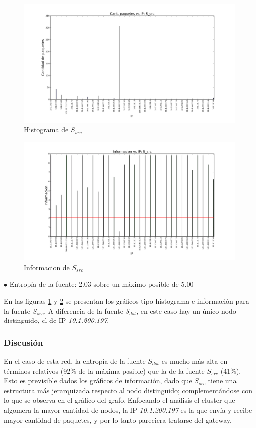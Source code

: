 \begin{figure}[H]\centering
    \includegraphics[width=\linewidth]{../imgs/red-entrepiso-dc_S_src_hist.png}
    \caption{Histograma de $S_{src}$}\label{fig:entrepiso-dc-src-hist}
\end{figure}

\begin{figure}[H]\centering
    \includegraphics[width=\linewidth]{../imgs/red-entrepiso-dc_S_src_info.png}
    \caption{Informacion de $S_{src}$}\label{fig:entrepiso-dc-src-info}
\end{figure}

$\bullet$ Entropía de la fuente: 2.03 sobre un máximo posible de 5.00

En las figuras \ref{fig:entrepiso-dc-src-hist} y \ref{fig:entrepiso-dc-src-info} se presentan los gráficos tipo histograma e información para la fuente $S_{src}$. A diferencia de la fuente $S_{dst}$, en este caso hay un único nodo distinguido, el de IP \emph{10.1.200.197}.

\subsubsection{Discusión}

En el caso de esta red, la entropía de la fuente $S_{dst}$ es mucho más alta en términos relativos (92\% de la máxima posible) que la de la fuente $S_{src}$ (41\%). Esto es previsible dados los gráficos de información, dado que $S_{src}$ tiene una estructura más jerarquizada respecto al nodo distinguido; complementándose con lo que se observa en el gráfico del grafo.
Enfocando el análisis el cluster que algomera la mayor cantidad de nodos, la IP \emph{10.1.200.197} es la que envía y recibe mayor cantidad de paquetes, y por lo tanto pareciera tratarse del gateway.